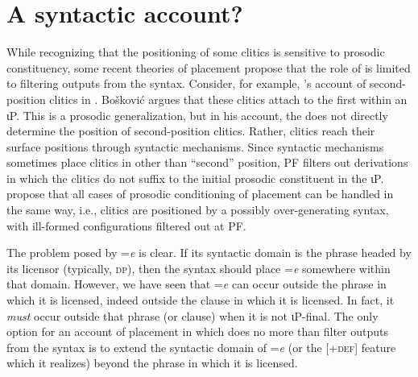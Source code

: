 \documentclass[output=paper,
modfonts
]{LSP/langsci}
\begin{document}
\section{A syntactic account?}
While recognizing that the positioning of some clitics is sensitive to prosodic con\-stit\-u\-en\-cy, some recent theories of
 placement propose that the role of  is limited to filtering outputs from the syntax. 
Consider, for example, \citet{boskovic2000}'s account of 
second-position clitics in .
Bo\v{s}kovi\'{c} argues that these clitics attach to the first  within an ιP. 
This is a prosodic generalization, but in his account, the  does not directly determine the position of second-position clitics. 
Rather, clitics reach their surface positions through syntactic mechanisms.
Since syntactic mechanisms sometimes place clitics in other than ``second'' position, PF filters out derivations 
in which the clitics do not suffix to the initial prosodic constituent in the ιP. 
\citet{otero2011} propose that all cases of prosodic conditioning of  placement can be handled in the same way,
i.e., clitics are positioned by a possibly over-generating syntax, with ill-formed configurations filtered out at PF.

The problem posed by =\emph{e} is clear.   If its syntactic domain is the phrase headed by its licensor (typically, \textsc{dp}), 
then the syntax should place =\emph{e} somewhere within that domain.
However, we have seen that =\emph{e} can occur outside the phrase in which it is licensed, indeed outside the  
clause in which it is licensed. In fact, it \emph{must} occur outside that phrase (or clause) when it is not ιP-final.
The only option for  an account of  placement in which  does no more than filter outputs from the syntax is to extend
 the syntactic domain of =\emph{e} (or the [+\textsc{def}] feature which it realizes) beyond  the 
phrase in which it is licensed. 
 
\end{document}
